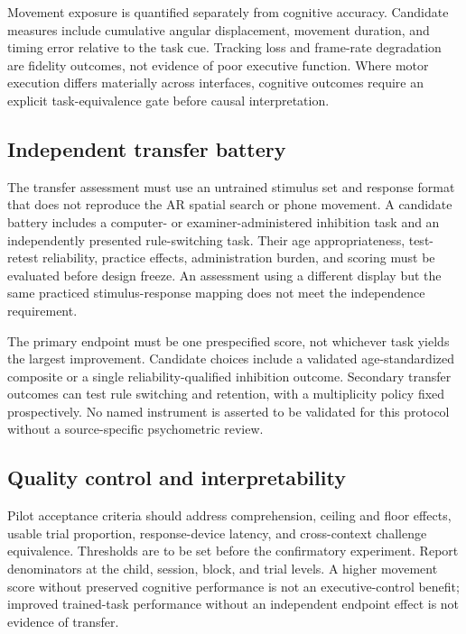 Movement exposure is quantified separately from cognitive accuracy. Candidate measures include cumulative angular displacement, movement duration, and timing error relative to the task cue. Tracking loss and frame-rate degradation are fidelity outcomes, not evidence of poor executive function. Where motor execution differs materially across interfaces, cognitive outcomes require an explicit task-equivalence gate before causal interpretation.

\subsection{Independent transfer battery}
The transfer assessment must use an untrained stimulus set and response format that does not reproduce the AR spatial search or phone movement. A candidate battery includes a computer- or examiner-administered inhibition task and an independently presented rule-switching task. Their age appropriateness, test-retest reliability, practice effects, administration burden, and scoring must be evaluated before design freeze. An assessment using a different display but the same practiced stimulus-response mapping does not meet the independence requirement.

The primary endpoint must be one prespecified score, not whichever task yields the largest improvement. Candidate choices include a validated age-standardized composite or a single reliability-qualified inhibition outcome. Secondary transfer outcomes can test rule switching and retention, with a multiplicity policy fixed prospectively. No named instrument is asserted to be validated for this protocol without a source-specific psychometric review.

\subsection{Quality control and interpretability}
Pilot acceptance criteria should address comprehension, ceiling and floor effects, usable trial proportion, response-device latency, and cross-context challenge equivalence. Thresholds are to be set before the confirmatory experiment. Report denominators at the child, session, block, and trial levels. A higher movement score without preserved cognitive performance is not an executive-control benefit; improved trained-task performance without an independent endpoint effect is not evidence of transfer.